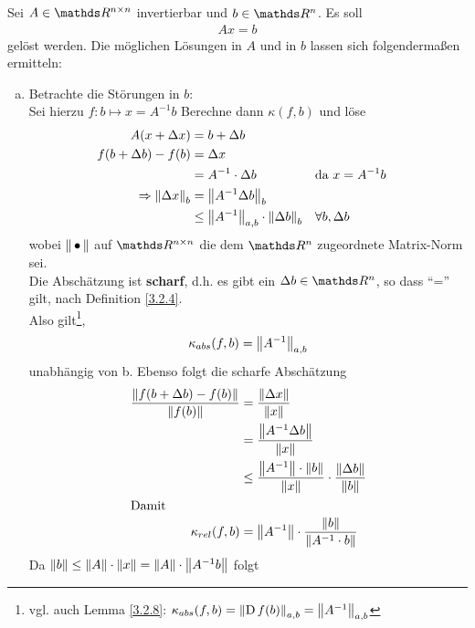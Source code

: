 \begin{Bspe}
  \label{3.2.10}
  Sei $A\in \R^{n\times n}$ invertierbar und $b\in \R^n$. Es soll 
  \begin{gather*}
    Ax =b
  \end{gather*}
  gelöst werden.
  Die möglichen Lösungen in $A$ und in $b$ lassen sich folgendermaßen ermitteln:
  \begin{enumerate}[a)]
  \item Betrachte die Störungen in $b$:\\
    Sei hierzu $f\colon b\mapsto x= A^{-1}b$
    Berechne dann $ \kappa(f,b)$ und löse 
    \begin{align*}
      A(x + \Delta x) &= b+\Delta b \\
      f(b + \Delta b) - f(b) &= \Delta x \\
                      &= A^{-1} \cdot \Delta b && \text{da }x = A^{-1}b \\
      \Rightarrow \nn[\Delta x]_{b}  &= \nn[A^{-1}\Delta b]_{b} \\
                      &\leq \nn[A^{-1}]_{a,b}\cdot \nn[\Delta b]_{b} && \forall b, \Delta b 
    \end{align*}
    wobei $\nn$ auf $\Renn$ die dem $\Ren$ zugeordnete Matrix-Norm sei. \\
    Die Abschätzung ist \textbf{scharf}, 
    d.h. es gibt ein $\Delta b\in \R^n$, so dass \enquote{=} gilt, 
    nach Definition \ref{3.2.4}. \\
    Also gilt\footnote{vgl. auch Lemma \ref{3.2.8}: $\kappa_{abs}(f,b)=\nn[\D f(b)]_{a,b}=\nn[A^{-1}]_{a,b}$},
    \begin{gather}
      \kappa_{abs}(f,b) = \nn[A^{-1}]_{a,b} \label{III.2.6}
    \end{gather}
    unabhängig von b.
    Ebenso folgt die scharfe Abschätzung 
    \begin{align}
      \nonumber
      \frac{\nn[	f(b + \Delta b) - f(b)]}{\nn[f(b)]} 
      &= \frac{\nn[\Delta x]}{\nn[x]}\\ \nonumber
      &= \frac{\nn[A^{-1}\Delta b]}{\nn[x]} \\ \nonumber
      &\leq  \frac{\nn[A^{-1}]\cdot \nn[b]}{\nn[x]} \cdot \frac{\nn[\Delta b]}{\nn[b]} \\
      \intertext{Damit}
      \kappa_{rel} (f,b) 
      &= \nn[A^{-1}]\cdot\frac{\nn[b]}{\nn[A^{-1}\cdot b]}
        \label{III.2.7}
    \end{align}
    Da $\nn[b] \leq \nn[A]\cdot\nn[x] = \nn[A]\cdot \nn[A^{-1}b]$ folgt

\end{enumerate}
\end{Bspe}
